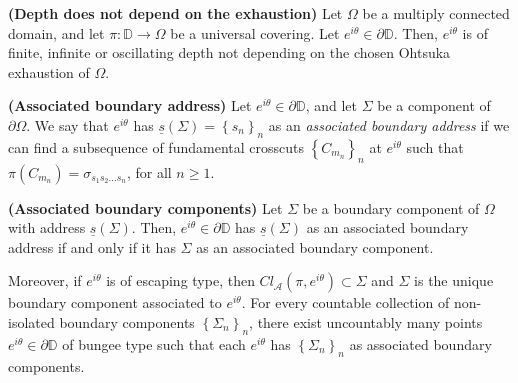 \documentclass[10pt,a4paper]{amsart}
\def\DD{\mathbb{D}}
\begin{document}
\begin{lemma}{\bf (Depth does not depend on the exhaustion)}\label{lemma-equivalence-ohtsuka}
	Let $ \Omega $ be a multiply connected domain, and let $ \pi\colon \mathbb{D}\to\Omega $ be a universal covering. Let $ e^{i\theta} \in\partial\mathbb{D}$. Then, $ e^{i\theta} $ is of finite, infinite or oscillating depth  not depending on the chosen Ohtsuka exhaustion of $ \Omega $.
\end{lemma}

\begin{defi}{\bf (Associated boundary address)}\label{def:associatedaddress}
Let $e^{i\theta}\in\partial\DD$, and let $\Sigma$ be a component of $\partial\Omega$. We say that $e^{i\theta}$ has $\underline{s}(\Sigma) = \left\lbrace s_n\right\rbrace _n$ as an \textit{associated boundary address} if we can find a subsequence of fundamental crosscuts $\left\lbrace C_{m_n}\right\rbrace _n$ at $e^{i\theta}$ such that $\pi(C_{m_n}) = \sigma_{s_1s_2\dots s_n}$, for all $n\geq 1$.
\end{defi}

\begin{prop}{\bf (Associated boundary components)}\label{prop-associated-boundary-comp}
Let $ \Sigma $ be a boundary component of $ \Omega $ with address $ \underline{s} (\Sigma)$.
Then,	$ e^{i\theta} \in\partial\mathbb{D}$ has $ \underline{s} (\Sigma)$ as an associated boundary address if and only if it has $\Sigma$ as an associated boundary component. 

\noindent Moreover, if $ e^{i\theta} $ is of escaping type, then $  Cl_{\mathcal{A}}(\pi, e^{i\theta})\subset\Sigma$ and $ \Sigma $ is the unique boundary component associated to $ e^{i\theta}$. For every countable collection of non-isolated boundary components $ \left\lbrace \Sigma_n \right\rbrace _n$, there exist uncountably many points $ e^{i\theta}\in\partial\mathbb{D} $ of bungee type such that each $e^{i\theta}$ has $ \left\lbrace \Sigma_n \right\rbrace _n$ as associated boundary components.
\end{prop}
\end{document}
